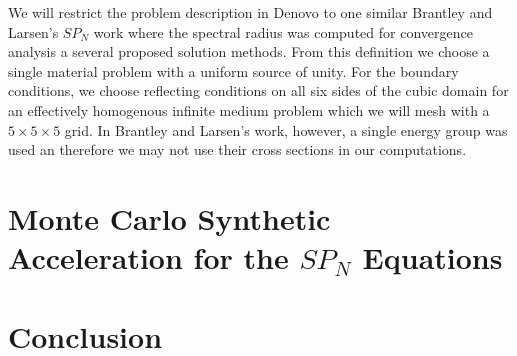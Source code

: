 \documentclass[letterpaper,12pt]{article}
\begin{document}
We will restrict the problem description in Denovo to one similar
Brantley and Larsen's $SP_N$ work where the spectral radius was
computed for convergence analysis a several proposed solution
methods. From this definition we choose a single material problem with
a uniform source of unity. For the boundary conditions, we choose
reflecting conditions on all six sides of the cubic domain for an
effectively homogenous infinite medium problem which we will mesh with
a $5\times 5\times 5$ grid. In Brantley and Larsen's work, however, a
single energy group was used an therefore we may not use their cross
sections in our computations.

\section{Monte Carlo Synthetic Acceleration for the $SP_N$ Equations}
\label{sec:monte_carlo}

\section{Conclusion}
\label{sec:conclusion}

\pagebreak
 

\end{document}
